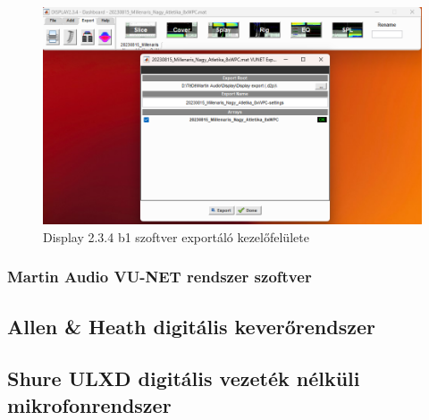 \begin{figure}[H]
    \centering
    \includegraphics[width=\textwidth, keepaspectratio]{figures/display_wpc_7.png}
    \caption{Display 2.3.4 b1 szoftver exportáló kezelőfelülete}\label{fig:display_wpc_7}
\end{figure}

\subsubsection{Martin Audio VU-NET rendszer szoftver}


\subsection{Allen \& Heath digitális keverőrendszer}



\subsection{Shure ULXD digitális vezeték nélküli mikrofonrendszer}



